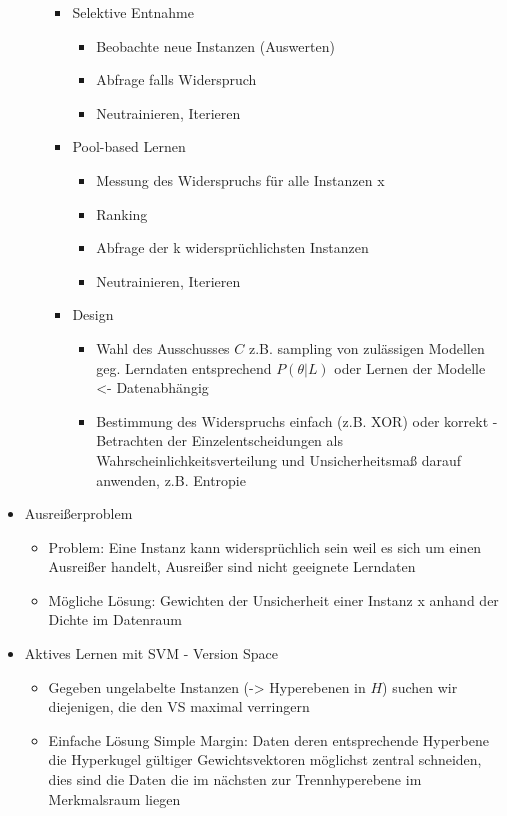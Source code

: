 \documentclass[paper=a4, fontsize=11pt]{scrartcl} %
\numberwithin{equation}{section} %
\numberwithin{figure}{section} %
\numberwithin{table}{section} %
\begin{document}
\begin{itemize}
\begin{itemize}
\begin{itemize}
\begin{itemize}
\end{itemize}
\item Selektive Entnahme
\begin{itemize}
\item Beobachte neue Instanzen (Auswerten)
\item Abfrage falls Widerspruch
\item Neutrainieren, Iterieren
\end{itemize}
\item Pool-based Lernen
\begin{itemize}
\item Messung des Widerspruchs für alle Instanzen x
\item Ranking
\item Abfrage der k widersprüchlichsten Instanzen
\item Neutrainieren, Iterieren
\end{itemize}
\item Design
\begin{itemize}
\item Wahl des Ausschusses $C$ z.B. sampling von zulässigen Modellen geg. Lerndaten entsprechend $P(\theta|L)$ oder Lernen der Modelle <- Datenabhängig
\item Bestimmung des Widerspruchs einfach (z.B. XOR) oder korrekt - Betrachten der Einzelentscheidungen als Wahrscheinlichkeitsverteilung und Unsicherheitsmaß darauf anwenden, z.B. Entropie
\end{itemize}
\end{itemize}
\end{itemize}
\item Ausreißerproblem
\begin{itemize}
\item Problem: Eine Instanz kann widersprüchlich sein weil es sich um einen Ausreißer handelt, Ausreißer sind nicht geeignete Lerndaten
\item Mögliche Lösung: Gewichten der Unsicherheit einer Instanz x anhand der Dichte im Datenraum
\end{itemize}
\item Aktives Lernen mit SVM - Version Space
\begin{itemize}
\item Gegeben ungelabelte Instanzen (-> Hyperebenen in $H$) suchen wir diejenigen, die den VS maximal verringern
\item Einfache Lösung Simple Margin: Daten deren entsprechende Hyperbene die Hyperkugel gültiger Gewichtsvektoren möglichst zentral schneiden, dies sind die Daten die im nächsten zur Trennhyperebene im Merkmalsraum liegen

\end{itemize}
\end{itemize}
\end{document}
